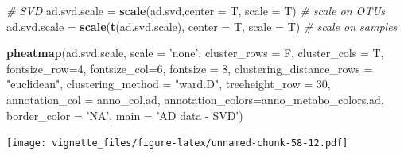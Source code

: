 \documentclass[]{book}
\newenvironment{Shaded}{\begin{snugshade}}{\end{snugshade}}
\newcommand{\KeywordTok}[1]{\textcolor[rgb]{0.13,0.29,0.53}{\textbf{#1}}}
\newcommand{\DataTypeTok}[1]{\textcolor[rgb]{0.13,0.29,0.53}{#1}}
\newcommand{\DecValTok}[1]{\textcolor[rgb]{0.00,0.00,0.81}{#1}}
\newcommand{\StringTok}[1]{\textcolor[rgb]{0.31,0.60,0.02}{#1}}
\newcommand{\CommentTok}[1]{\textcolor[rgb]{0.56,0.35,0.01}{\textit{#1}}}
\newcommand{\NormalTok}[1]{#1}
\begin{document}
\begin{Shaded}
\begin{Highlighting}[]
\CommentTok{# SVD}
\NormalTok{ad.svd.scale =}\StringTok{ }\KeywordTok{scale}\NormalTok{(ad.svd,}\DataTypeTok{center =}\NormalTok{ T, }\DataTypeTok{scale =}\NormalTok{ T) }\CommentTok{# scale on OTUs}
\NormalTok{ad.svd.scale =}\StringTok{ }\KeywordTok{scale}\NormalTok{(}\KeywordTok{t}\NormalTok{(ad.svd.scale), }\DataTypeTok{center =}\NormalTok{ T, }\DataTypeTok{scale =}\NormalTok{ T) }\CommentTok{# scale on samples}

\KeywordTok{pheatmap}\NormalTok{(ad.svd.scale, }
         \DataTypeTok{scale =} \StringTok{'none'}\NormalTok{, }
         \DataTypeTok{cluster_rows =}\NormalTok{ F, }
         \DataTypeTok{cluster_cols =}\NormalTok{ T, }
         \DataTypeTok{fontsize_row=}\DecValTok{4}\NormalTok{, }\DataTypeTok{fontsize_col=}\DecValTok{6}\NormalTok{,}
         \DataTypeTok{fontsize =} \DecValTok{8}\NormalTok{,}
         \DataTypeTok{clustering_distance_rows =} \StringTok{"euclidean"}\NormalTok{,}
         \DataTypeTok{clustering_method =} \StringTok{"ward.D"}\NormalTok{,}
         \DataTypeTok{treeheight_row =} \DecValTok{30}\NormalTok{,}
         \DataTypeTok{annotation_col =}\NormalTok{ anno_col.ad,}
         \DataTypeTok{annotation_colors=}\NormalTok{anno_metabo_colors.ad,}
         \DataTypeTok{border_color =} \StringTok{'NA'}\NormalTok{,}
         \DataTypeTok{main =} \StringTok{'AD data - SVD'}\NormalTok{)}
\end{Highlighting}
\end{Shaded}

\texttt{[image: vignette\_files/figure-latex/unnamed-chunk-58-12.pdf]}
\end{document}

